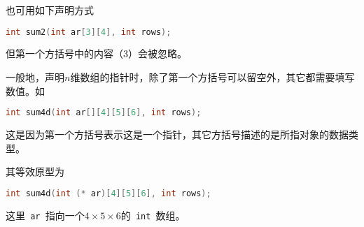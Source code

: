 \begin{frame}[fragile]
也可用如下声明方式
\begin{lstlisting}[language=c,backgroundcolor=\color{red!20}]
int sum2(int ar[3][4], int rows);
\end{lstlisting}
但第一个方括号中的内容（3）会被忽略。
\end{frame}


\begin{frame}[fragile]
一般地，声明$n$维数组的指针时，除了第一个方括号可以留空外，其它都需要填写数值。如
\begin{lstlisting}[language=c,backgroundcolor=\color{red!20}]
int sum4d(int ar[][4][5][6], int rows);
\end{lstlisting}
这是因为第一个方括号表示这是一个指针，其它方括号描述的是所指对象的数据类型。
\pause \vspace{0.15in}

其等效原型为
\begin{lstlisting}[language=c,backgroundcolor=\color{red!20}]
int sum4d(int (* ar)[4][5][6], int rows);
\end{lstlisting}
这里\lstinline| ar |指向一个$4\times5\times6$的\lstinline| int |数组。
\end{frame}

